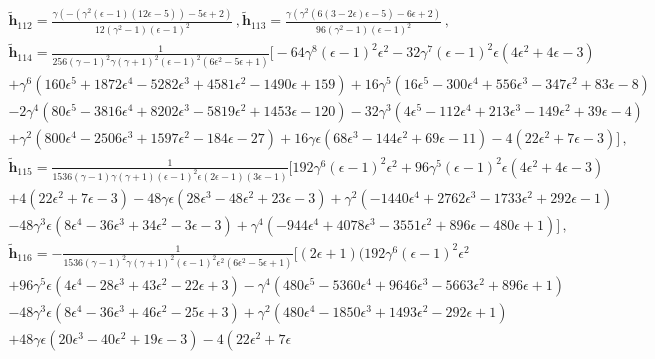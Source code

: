 \begin{align}
\begin{split}
&\boldsymbol{\tilde h}_{112}=\frac{\gamma  \left(-\left(\gamma ^2 (\epsilon -1) (12 \epsilon -5)\right)-5 \epsilon +2\right)}{12 \left(\gamma ^2-1\right) (\epsilon -1)^2}\,,\boldsymbol{\tilde h}_{113}=\frac{\gamma  \left(\gamma ^2 (6 (3-2 \epsilon ) \epsilon -5)-6 \epsilon +2\right)}{96 \left(\gamma ^2-1\right) (\epsilon -1)^2}\,,\\& \boldsymbol{\tilde h}_{114}=\frac{1}{256(\gamma -1)^2\gamma (\gamma +1)^2(\epsilon -1)^2\left(6 \epsilon ^2-5 \epsilon +1\right)}\Bigg[-64 \gamma ^8 (\epsilon -1)^2 \epsilon ^2-32 \gamma ^7 (\epsilon -1)^2 \epsilon  \left(4 \epsilon ^2+4 \epsilon -3\right)\\&+\gamma ^6 \left(160 \epsilon ^5+1872 \epsilon ^4-5282 \epsilon ^3+4581 \epsilon ^2-1490 \epsilon +159\right)+16 \gamma ^5 \left(16 \epsilon ^5-300 \epsilon ^4+556 \epsilon ^3-347 \epsilon ^2+83 \epsilon -8\right)\\&-2 \gamma ^4 \left(80 \epsilon ^5-3816 \epsilon ^4+8202 \epsilon ^3-5819 \epsilon ^2+1453 \epsilon -120\right)-32 \gamma ^3 \left(4 \epsilon ^5-112 \epsilon ^4+213 \epsilon ^3-149 \epsilon ^2+39 \epsilon -4\right)\\&+\gamma ^2 \left(800 \epsilon ^4-2506 \epsilon ^3+1597 \epsilon ^2-184 \epsilon -27\right)+16 \gamma  \epsilon  \left(68 \epsilon ^3-144 \epsilon ^2+69 \epsilon -11\right)-4 \left(22 \epsilon ^2+7 \epsilon -3\right)\Bigg]\,,\\& \boldsymbol{\tilde h}_{115}=\frac{1}{1536 (\gamma -1) \gamma  (\gamma +1) (\epsilon -1)^2 \epsilon  (2 \epsilon -1) (3 \epsilon -1)}\Bigg[192 \gamma ^6 (\epsilon -1)^2 \epsilon ^2+96 \gamma ^5 (\epsilon -1)^2 \epsilon  \left(4 \epsilon ^2+4 \epsilon -3\right)\\&+4 \left(22 \epsilon ^2+7 \epsilon -3\right)-48 \gamma  \epsilon  \left(28 \epsilon ^3-48 \epsilon ^2+23 \epsilon -3\right)+\gamma ^2 \left(-1440 \epsilon ^4+2762 \epsilon ^3-1733 \epsilon ^2+292 \epsilon -1\right)\\&-48 \gamma ^3 \epsilon  \left(8 \epsilon ^4-36 \epsilon ^3+34 \epsilon ^2-3 \epsilon -3\right)+\gamma ^4\left(-944 \epsilon ^4+4078 \epsilon ^3-3551 \epsilon ^2+896 \epsilon -480 \epsilon +1\right)\Bigg]\,,\\&\boldsymbol{\tilde h}_{116}=-\frac{1}{1536 (\gamma -1)^2 \gamma  (\gamma +1)^2 (\epsilon -1)^2 \epsilon ^2 \left(6 \epsilon ^2-5 \epsilon +1\right)}\Bigg[\left(2 \epsilon +1\right)\big(192 \gamma ^6 (\epsilon -1)^2 \epsilon ^2\\&+96 \gamma ^5 \epsilon  \left(4 \epsilon ^4-28 \epsilon ^3+43 \epsilon ^2-22 \epsilon +3\right)-\gamma ^4 \left(480 \epsilon ^5-5360 \epsilon ^4+9646 \epsilon ^3-5663 \epsilon ^2+896 \epsilon +1\right)\\&-48 \gamma ^3 \epsilon  \left(8 \epsilon ^4-36 \epsilon ^3+46 \epsilon ^2-25 \epsilon +3\right)+\gamma ^2 \left(480 \epsilon ^4-1850 \epsilon ^3+1493 \epsilon ^2-292 \epsilon +1\right)\\&+48 \gamma  \epsilon  \left(20 \epsilon ^3-40 \epsilon ^2+19 \epsilon -3\right)-4 \left(22 \epsilon ^2+7 \epsilon 
\end{split}
\end{align}
